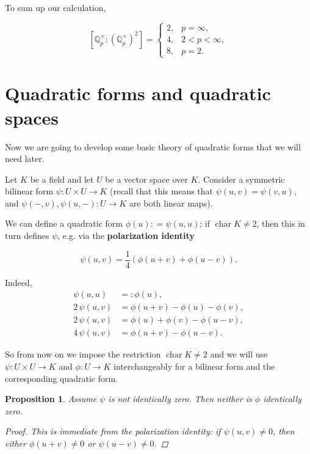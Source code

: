 \documentclass{article}
\newcommand{\term}{\textbf}
\newcommand{\dfn}{\mathrel{\mathop:}=}
\newcommand{\rdfn}{=\mathrel{\mathop:}}
\newcommand{\QQ}{\mathbb{Q}}
\DeclareMathOperator{\fchar}{char}
\theoremstyle{myplain}
\newtheorem{proposition}{Proposition}[section]
\theoremstyle{mydefinition}
\begin{document}
\vspace{1em}

To sum up our calculation,

\[ [\QQ_p^\times : (\QQ_p^\times)^2] =
  \left\{\begin{array}{ll}
           2, & p = \infty,\\
           4, & 2 < p < \infty,\\
           8, & p = 2.
         \end{array}\right. \]

\section{Quadratic forms and quadratic spaces}

Now we are going to develop some basic theory of quadratic forms that we will
need later.

\vspace{1em}

Let $K$ be a field and let $U$ be a vector space over $K$. Consider a symmetric
bilinear form $\psi\colon U\times U\to K$ (recall that this means that
$\psi (u,v) = \psi (v,u)$, and $\psi (-,v), \psi (u,-)\colon U\to K$ are both
linear maps).

We can define a quadratic form $\phi (u) \dfn \psi (u,u)$; if $\fchar K \ne 2$,
then this in turn defines $\psi$, e.g. via the \term{polarization identity}

\[ \psi (u,v) = \frac{1}{4} (\phi (u+v) + \phi (u-v)). \]

Indeed,
\begin{align*}
  \psi (u,u) & \rdfn \phi (u),\\
  2 \, \psi (u,v) & = \phi (u+v) - \phi (u) - \phi (v),\\
  2 \, \psi (u,v) & = \phi (u) + \phi (v) - \phi (u-v),\\
  4 \, \psi (u,v) & = \phi (u+v) - \phi (u-v).
\end{align*}

So from now on we impose the restriction $\fchar K \ne 2$ and we will use
$\psi\colon U\times U\to K$ and $\phi\colon U\to K$ interchangeably for a
bilinear form and the corresponding quadratic form.

\begin{proposition}
  Assume $\psi$ is not identically zero. Then neither is $\phi$ identically
  zero.

  \begin{proof}
    This is immediate from the polarization identity: if $\psi (u,v) \ne 0$,
    then either $\phi (u+v) \ne 0$ or $\psi (u-v) \ne 0$.
  \end{proof}
\end{proposition}
\end{document}
